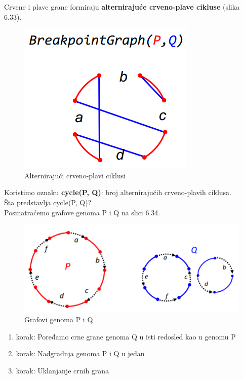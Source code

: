 {\color{red} Crvene} i {\color{blue} plave} grane formiraju \textbf{alternirajuće crveno-plave cikluse} (slika 6.33).
\begin{figure}[h!]
\centering
\includegraphics[scale=0.7]{poglavlja/6/slike/alternirajuci.PNG}
\caption{Alternirajući crveno-plavi ciklusi }
\label{slika:X}
\end{figure}

\newpage
\noindent Koristimo oznaku \textbf{cycle(P, Q)}: broj alternirajućih crveno-plavih ciklusa.\\

\noindent Šta predstavlja cycle(P, Q)?\\

\noindent Posmatraćemo grafove genoma P i Q na slici 6.34.
\begin{figure}[h!]
\includegraphics[scale=0.7]{poglavlja/6/slike/PiQ1.PNG}
\caption{Grafovi genoma P i Q}
\label{slika:X}
\end{figure}

\begin{enumerate}
\item {korak: Poređamo crne grane genoma Q u isti redosled kao u genomu P}
\item {korak: Nadgradnja genoma P i Q u jedan}
\item {korak: Uklanjanje crnih grana}
\end{enumerate}

